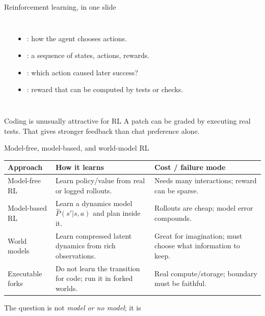 \begin{frame}{Reinforcement learning, in one slide}
\begin{columns}[T,onlytextwidth]
\begin{center}
\end{center}
\small
\begin{itemize}
  \item {}: how the agent chooses actions.
  \item {}: a sequence of states, actions, rewards.
  \item {}: which action caused later success?
  \item {}: reward that can be computed by tests or checks.
\end{itemize}
\end{columns}

\vspace{0.45em}
\begin{block}{Coding is unusually attractive for RL}
A patch can be graded by executing real tests. That gives stronger feedback than chat preference alone.
\end{block}
\end{frame}

\begin{frame}{Model-free, model-based, and world-model RL}
\small
\begin{tabular}{p{}p{}p{}}
\toprule
\textbf{Approach} & \textbf{How it learns} & \textbf{Cost / failure mode} \\
\midrule
Model-free RL & Learn policy/value from real or logged rollouts. & Needs many interactions; reward can be sparse. \\
Model-based RL & Learn a dynamics model $\hat{P}(s'|s,a)$ and plan inside it. & Rollouts are cheap; model error compounds. \\
World models & Learn compressed latent dynamics from rich observations. & Great for imagination; must choose what information to keep. \\
Executable forks & Do not learn the transition for code; run it in forked worlds. & Real compute/storage; boundary must be faithful. \\
\bottomrule
\end{tabular}

\vspace{0.8em}
\centering\large The question is not \emph{model or no model}; it is 
\end{frame}

